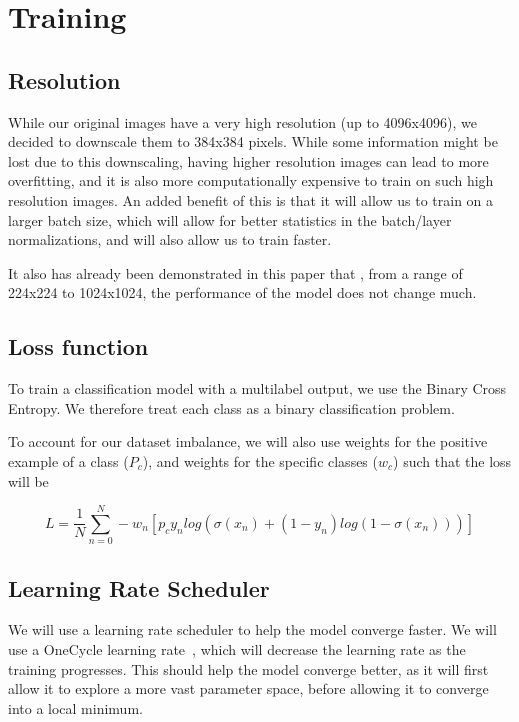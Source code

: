 \documentclass[11pt]{article}
\begin{document}
    \section{Training}

    \subsection{Resolution}

        While our original images have a very high resolution (up to 4096x4096), we decided to downscale them to
        384x384 pixels. While some information might be lost due to this downscaling, having higher resolution images
        can lead to more overfitting, and it is also more computationally expensive to train on such high resolution
        images. An added benefit of this is that it will allow us to train on a larger batch size, which will allow
        for better statistics in the batch/layer normalizations, and will also allow us to train faster.

        It also has already been demonstrated in this paper \cite{resolution} that , from a range of 224x224 to
        1024x1024, the performance of the model does not change much.

    \subsection{Loss function}
        To train a classification model with a multilabel output, we use the Binary Cross Entropy. We therefore treat
        each class as a binary classification problem.

        To account for our dataset imbalance, we will also use weights for the positive example of a class ($P_c$), and weights for the specific classes ($w_c$) such that the loss will be

        \begin{equation}
            L = \frac{1}{N}\sum_{n=0}^N -w_n[p_c y_n log(\sigma(x_n)+(1-y_n) log(1-\sigma(x_n)))]
        \end{equation}

    \subsection{Learning Rate Scheduler}

        We will use a learning rate scheduler to help the model converge faster. We will use a OneCycle learning rate~\cite{onecyclelr}, which will
        decrease the learning rate as the training progresses. This should help the model converge better, as it will first allow it to explore a more vast
        parameter space, before allowing it to converge into a local minimum.
\end{document}
